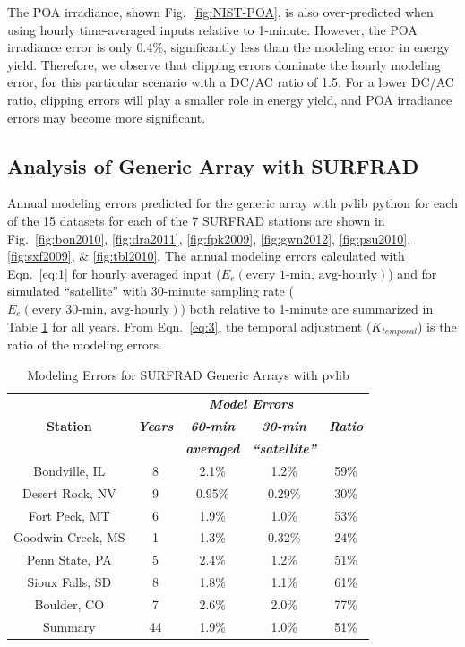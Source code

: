 \documentclass[conference]{IEEEtran}
\begin{document}
The POA irradiance, shown Fig.~\ref{fig:NIST-POA}, is also over-predicted when using hourly time-averaged inputs relative to 1-minute. However, the POA irradiance error is only 0.4\%, significantly less than the modeling error in energy yield. Therefore, we observe that clipping errors dominate the hourly modeling error, for this particular scenario with a DC/AC ratio of 1.5. For a lower DC/AC ratio, clipping errors will play a smaller role in energy yield, and POA irradiance errors may become more significant.

\subsection{Analysis of Generic Array with SURFRAD}
Annual modeling errors predicted for the generic array with pvlib python for each of the 15 datasets for each of the 7 SURFRAD stations are shown in Fig.~\ref{fig:bon2010}, \ref{fig:dra2011}, \ref{fig:fpk2009}, \ref{fig:gwn2012}, \ref{fig:psu2010}, \ref{fig:sxf2009}, \& \ref{fig:tbl2010}. The annual modeling errors calculated with Eqn.~\ref{eq:1} for hourly averaged input ($E_e\left(\textrm{every 1-min, avg-hourly}\right)$) and for simulated ``satellite'' with 30-minute sampling rate ($E_e\left(\textrm{every 30-min, avg-hourly}\right)$) both relative to 1-minute are summarized in Table \ref{table:SURFRAD-summary} for all years. From Eqn.~\ref{eq:3}, the temporal adjustment ($K_{temporal}$) is the ratio of the modeling errors.

\begin{table}[htbp]
\caption{Modeling Errors for SURFRAD Generic Arrays with pvlib}
\begin{center}
\begin{tabular}{|c|c|c|c|c|}
\hline
& & \multicolumn{2}{c|}{\textbf{\textit{Model Errors}}} & \\\cline{3-4}
\textbf{Station}& \textbf{\textit{Years}}& \textbf{\textit{60-min}} & \textbf{\textit{30-min}} & \textbf{\textit{Ratio}} \\
& & \textbf{\textit{averaged}} & \textbf{\textit{``satellite''}} & \\
\hline
Bondville, IL      & 8 & 2.1\% & 1.2\% & 59\% \\
Desert Rock, NV    & 9 & 0.95\%& 0.29\%& 30\% \\
Fort Peck, MT      & 6 & 1.9\% & 1.0\% & 53\% \\
Goodwin Creek, MS  & 1 & 1.3\% & 0.32\%& 24\% \\
Penn State, PA     & 5 & 2.4\% & 1.2\% & 51\% \\
Sioux Falls, SD    & 8 & 1.8\% & 1.1\% & 61\% \\
Boulder, CO        & 7 & 2.6\% & 2.0\% & 77\% \\
\hline
Summary& 44& 1.9\% & 1.0\% & 51\% \\
\hline
\end{tabular}
\label{table:SURFRAD-summary}
\end{center}
\end{table}
\end{document}
